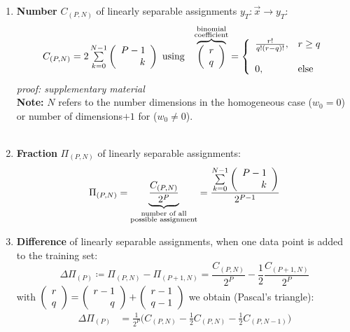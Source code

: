 \begin{enumerate}[(1)]
\item \textbf{Number} $C_{(P,N)}$ of linearly separable assignments $y_T: \vec{x} \rightarrow y_T$:
\begin{equation}
	\begin{array}{ll}
	C_{(P,N)} = 2 \sum\limits_{k = 0}^{N - 1} 
		\left( \begin{array}{rrrrrrrrrrrrrrrrrrrrrrrrrr} P - 1 \\ k\\ \end{array} \right) \text{ using}
	& \overbrace{ \left( \begin{array}{rrrrrrrrrrrrrrrrrrrrrrrrrr} r \\ q\\ \end{array} \right) }^{\substack{\text{binomial} \\ 
						\text{coefficient}} }
		= \left \{ \begin{array}{ll}
			\frac{r!}{q! (r-q)!}, & r \geq q \\\\
			0, & \text{else}
		\end{array} \right.
	\end{array}
\end{equation}
{\it proof: supplementary material}\\
\textbf{Note:} $N$ refers to the number dimensions in the homogeneous case ($w_0=0$) or number of dimensions$+1$ for
($w_0 \neq 0$). 
\\\\
\item \textbf{Fraction} $\Pi_{(P,N)}$ of linearly separable assignments:
\begin{equation}
	\Pi_{(P,N)} 
	= \underbrace{ \frac{C_{(P,N)}}{2^P} }_{
		\substack{ \text{number of all} \\
				\text{possible assignment}}}
	= \frac{\sum\limits_{k = 0}^{N-1} \left( \begin{array}{rrrrrrrrrrrrrrrrrrrrrrrrrr} P-1 \\ k\\ \end{array} \right) }{
			2^{P-1} }
\end{equation}
\item \textbf{Difference} of linearly separable assignments, when one data point is added to the training set:
\begin{equation}
	\Delta \Pi_{(P)} 
	\coloneqq \Pi_{(P,N)} - \Pi_{(P+1,N)} 
	= \frac{C_{(P,N)}}{2^P} - \frac{1}{2} \frac{C_{(P+1,N)}}{2^P}
\end{equation}
with $\left( \begin{array}{rrrrrrrrrrrrrrrrrrrrrrrrrr} r \\q\\ \end{array} \right) = \left( \begin{array}{rrrrrrrrrrrrrrrrrrrrrrrrrr} r-1 \\ q\\ \end{array} \right) + \left( \begin{array}{rrrrrrrrrrrrrrrrrrrrrrrrrr} r-1 \\q -1\\ \end{array} \right)$ we obtain (Pascal's triangle):
\begin{equation}
	\begin{array}{ll}
		\Delta \Pi_{(P)} 
		& = \frac{1}{2^P} \Big( C_{(P,N)} - \frac{1}{2} C_{(P,N)}
			- \frac{1}{2} C_{(P,N-1)} \Big) \\\\

\end{array}
\end{equation}
\end{enumerate}
